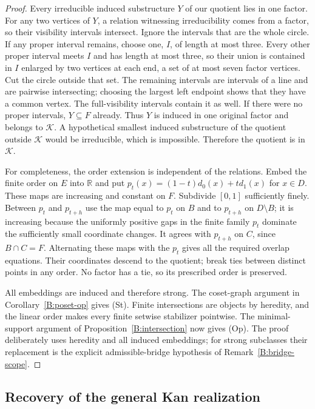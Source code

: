 \begin{proof}
Every irreducible induced substructure $Y$ of our quotient lies in one
factor. For any two vertices of $Y$, a relation witnessing
irreducibility comes from a factor, so their visibility intervals
intersect. Ignore the intervals that are the whole circle. If any
proper interval remains, choose one, $I$, of length at most three.
Every other proper interval meets $I$ and has length at most three,
so their union is contained in $I$ enlarged by two vertices at each
end, a set of at most seven factor vertices. Cut the circle outside
that set. The remaining intervals are intervals of a line and are
pairwise intersecting; choosing the largest left endpoint shows that
they have a common vertex. The full-visibility intervals contain it
as well. If there were no proper intervals, $Y\subseteq F$ already.
Thus $Y$ is induced in one original factor and belongs to
$\mathcal K$. A hypothetical smallest induced substructure of the
quotient outside $\mathcal K$ would be irreducible, which is impossible.
Therefore the quotient is in $\mathcal K$.

For completeness, the order extension is independent of the relations.
Embed the finite order on $E$ into $\mathbb R$ and put
$p_t(x)=(1-t)d_0(x)+td_1(x)$ for $x\in D$. These maps are increasing
and constant on $F$. Subdivide $[0,1]$ sufficiently finely. Between
$p_t$ and $p_{t+h}$ use the map equal to $p_t$ on $B$ and to
$p_{t+h}$ on $D\setminus B$; it is increasing because the uniformly
positive gaps in the finite family $p_t$ dominate the sufficiently
small coordinate changes. It agrees with $p_{t+h}$ on $C$, since
$B\cap C=F$. Alternating these maps with the $p_t$ gives all the
required overlap equations. Their coordinates descend to the quotient;
break ties between distinct points in any order. No factor has a tie,
so its prescribed order is preserved.

All embeddings are induced and therefore strong. The coset-graph
argument in Corollary~\ref{B:poset-op} gives (St). Finite intersections
are objects by heredity, and the linear order makes every finite
setwise stabilizer pointwise. The minimal-support argument of
Proposition~\ref{B:intersection} now gives (Op). The proof deliberately
uses heredity and all induced embeddings; for strong subclasses their
replacement is the explicit admissible-bridge hypothesis of
Remark~\ref{B:bridge-scope}.
\end{proof}

\subsection{Recovery of the general Kan realization}

